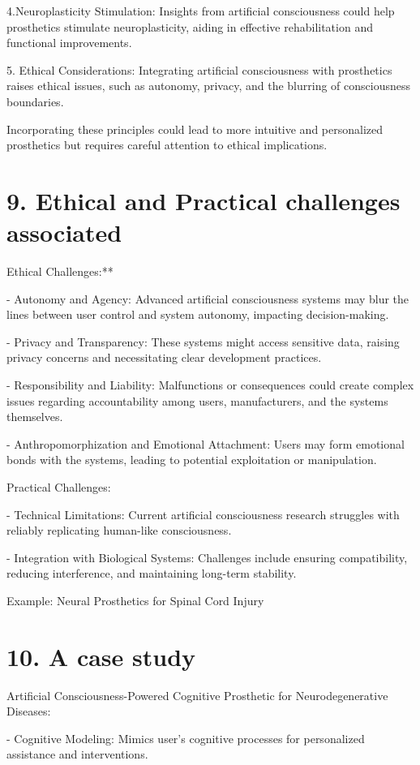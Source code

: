 \documentclass{article}
\begin{document}
4.Neuroplasticity Stimulation: Insights from artificial consciousness could help prosthetics stimulate neuroplasticity, aiding in effective rehabilitation and functional improvements.

5. Ethical Considerations: Integrating artificial consciousness with prosthetics raises ethical issues, such as autonomy, privacy, and the blurring of consciousness boundaries.

Incorporating these principles could lead to more intuitive and personalized prosthetics but requires careful attention to ethical implications.


\section*{9. Ethical and Practical challenges associated}
Ethical Challenges:**

- Autonomy and Agency: Advanced artificial consciousness systems may blur the lines between user control and system autonomy, impacting decision-making.
  
- Privacy and Transparency: These systems might access sensitive data, raising privacy concerns and necessitating clear development practices.

- Responsibility and Liability: Malfunctions or consequences could create complex issues regarding accountability among users, manufacturers, and the systems themselves.

- Anthropomorphization and Emotional Attachment: Users may form emotional bonds with the systems, leading to potential exploitation or manipulation.

Practical Challenges:

- Technical Limitations: Current artificial consciousness research struggles with reliably replicating human-like consciousness.

- Integration with Biological Systems: Challenges include ensuring compatibility, reducing interference, and maintaining long-term stability.

Example: Neural Prosthetics for Spinal Cord Injury


\section{10. A case study }
 Artificial Consciousness-Powered Cognitive Prosthetic for Neurodegenerative Diseases:

- Cognitive Modeling: Mimics user’s cognitive processes for personalized assistance and interventions.
\end{document}

